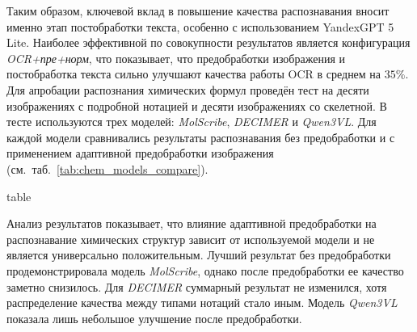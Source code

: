 \documentclass[11pt]{article}
\makeatletter
\def\bicaption@tablestr{table}
\newcommand{\bicaption}[2]{\caption{#1}\vspace{-0.7em}
	{\captionsetup{labelformat=empty}\edef\bicaption@type{\@captype}\ifx\bicaption@type\bicaption@tablestr
			\caption*{\textbf{Table~\thetable.} #2}\else
			\caption*{\textbf{Fig.~\thefigure.} #2}\fi
	}}
\makeatother
\begin{document}
\begin{multicols}{2}
Таким образом, ключевой вклад в повышение качества распознавания вносит именно этап постобработки текста, особенно с использованием YandexGPT 5 Lite. Наиболее эффективной по совокупности результатов является конфигурация \textit{OCR+пре+норм}, что показывает, что предобработки изображения и постобработка текста сильно улучшают качества работы OCR в среднем на $35\%$. 
Для апробации распознания химических формул проведён тест на десяти изображениях с подробной нотацией и десяти изображениях со скелетной. В тесте используются трех моделей: \textit{MolScribe}, \textit{DECIMER} и \textit{Qwen3VL}. Для каждой модели сравнивались результаты распознавания без предобработки и с применением адаптивной предобработки изображения (см.~таб.~\ref{tab:chem_models_compare}).

\begin{table}[t]
	\centering
	\small
	\setlength{\tabcolsep}{4pt}
	\renewcommand{\arraystretch}{1.15}
	\bicaption{
		Результаты распознавания химических структур в подробной и скелетной нотациях без предобработки и с адаптивной предобработкой
		}{
			Results of chemical structure recognition in detailed and skeletal notations without preprocessing and with adaptive preprocessing	
		}
	\label{tab:chem_models_compare}
\end{table}

Анализ результатов показывает, что влияние адаптивной предобработки на распознавание химических структур зависит от используемой модели и не является универсально положительным. Лучший результат без предобработки продемонстрировала модель \textit{MolScribe}, однако после предобработки ее качество заметно снизилось. Для \textit{DECIMER} суммарный результат не изменился, хотя распределение качества между типами нотаций стало иным. Модель \textit{Qwen3VL} показала лишь небольшое улучшение после предобработки.


\end{multicols}
\end{document}
